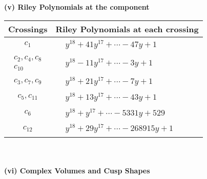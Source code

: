 \documentclass[1p]{elsarticle_modified}
\theoremstyle{definition}
\begin{document}
\newpage\renewcommand{\arraystretch}{1}
\flushleft \textbf{(v) Riley Polynomials at the component}\newline \\
\begin{tabular}{m{50pt}|m{274pt}}
Crossings & \hspace{64pt}Riley Polynomials at each crossing \\
\hline $$\begin{aligned}c_{1}\end{aligned}$$&$\begin{aligned}
&y^{18}+41 y^{17}+\cdots-47 y+1
\end{aligned}$\\
\hline $$\begin{aligned}c_{2},c_{4},c_{8}\\c_{10}\end{aligned}$$&$\begin{aligned}
&y^{18}-11 y^{17}+\cdots-3 y+1
\end{aligned}$\\
\hline $$\begin{aligned}c_{3},c_{7},c_{9}\end{aligned}$$&$\begin{aligned}
&y^{18}+21 y^{17}+\cdots-7 y+1
\end{aligned}$\\
\hline $$\begin{aligned}c_{5},c_{11}\end{aligned}$$&$\begin{aligned}
&y^{18}+13 y^{17}+\cdots-43 y+1
\end{aligned}$\\
\hline $$\begin{aligned}c_{6}\end{aligned}$$&$\begin{aligned}
&y^{18}+y^{17}+\cdots-5331 y+529
\end{aligned}$\\
\hline $$\begin{aligned}c_{12}\end{aligned}$$&$\begin{aligned}
&y^{18}+29 y^{17}+\cdots-268915 y+1
\end{aligned}$\\
\hline
\end{tabular}\\~\\
\newpage\flushleft \textbf{(vi) Complex Volumes and Cusp Shapes}
\end{document}
